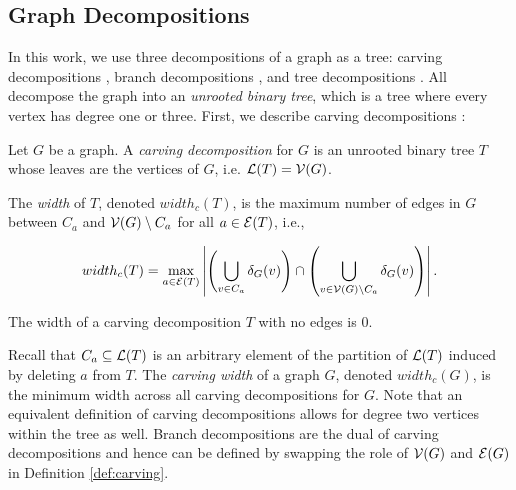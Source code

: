 \subsection{Graph Decompositions}
In this work, we use three decompositions of a graph as a tree: carving decompositions \cite{ST94}, branch decompositions \cite{RS91}, and tree decompositions \cite{RS91}. All decompose the graph into an \emph{unrooted binary tree}, which is a tree where every vertex has degree one or three. First, we describe carving decompositions \cite{ST94}:
\begin{definition}
\label{def:carving}
	Let $G$ be a graph. A \emph{carving decomposition} for $G$ is an unrooted binary tree $T$ whose leaves are the vertices of $G$, i.e. $\mathcal{L}(T) = \mathcal{V}(G)$. 
	
	The \emph{width} of $T$, denoted $width_c(T)$, is the maximum number of edges in $G$ between $C_a$ and $\mathcal{V}(G) \setminus C_a$ for all $a \in \mathcal{E}(T)$, i.e.,
    
	$$width_c(T) = \max_{a \in \mathcal{E}(T)} \left| \left( \bigcup_{v \in C_a} \delta_{G}(v) \right) \cap \left( \bigcup_{v \in \mathcal{V}(G) \setminus C_a} \delta_{G}(v) \right) \right|.$$
	
	
	
	
    The width of a carving decomposition $T$ with no edges is 0.
\end{definition}

Recall that $C_a \subseteq \mathcal{L}(T)$ is an arbitrary element of the partition of $\mathcal{L}(T)$ induced by deleting $a$ from $T$.
The \emph{carving width} of a graph $G$, denoted $width_c(G)$, is the minimum width across all carving decompositions for $G$. Note that an equivalent definition of carving decompositions allows for degree two vertices within the tree as well. 
Branch decompositions are the dual of carving decompositions and hence can be defined by swapping the role of $\mathcal{V}(G)$ and $\mathcal{E}(G)$ in Definition \ref{def:carving}.

